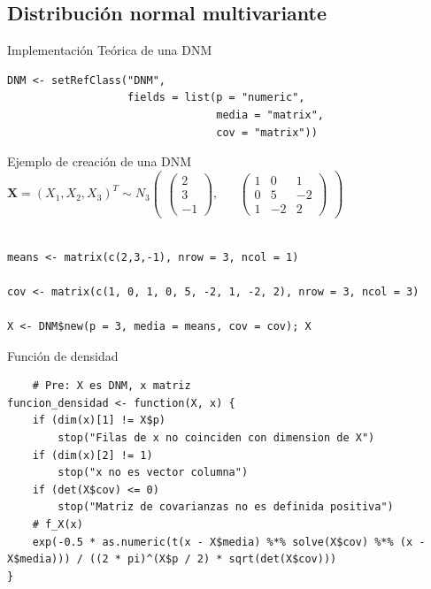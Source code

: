 \documentclass[xcolor=table]{beamer}
\begin{document}
\subsection{Distribución normal multivariante}
\begin{frame}[fragile]{Implementación Teórica de una DNM}

\begin{lstlisting}
DNM <- setRefClass("DNM", 
                   fields = list(p = "numeric", 
                                 media = "matrix", 
                                 cov = "matrix"))
\end{lstlisting}
\end{frame}

\begin{frame}[fragile]{Ejemplo de creación de una DNM}
$\pmb{X} = (X_1, X_2, X_3)^T \sim N_3 \begin{pmatrix} \begin{pmatrix} 2 \\ 3 \\ -1 \end{pmatrix}, && \begin{pmatrix} 1 & 0 & 1 \\ 0 & 5 & -2 \\ 1 & -2 & 2 \end{pmatrix} \end{pmatrix} $

\begin{lstlisting}

means <- matrix(c(2,3,-1), nrow = 3, ncol = 1)

cov <- matrix(c(1, 0, 1, 0, 5, -2, 1, -2, 2), nrow = 3, ncol = 3)

X <- DNM$new(p = 3, media = means, cov = cov); X

\end{lstlisting}
\end{frame}

\begin{frame}[fragile]{Función de densidad}
\small
  \begin{lstlisting}
    # Pre: X es DNM, x matriz
funcion_densidad <- function(X, x) {
    if (dim(x)[1] != X$p)
        stop("Filas de x no coinciden con dimension de X")
    if (dim(x)[2] != 1)
        stop("x no es vector columna")
    if (det(X$cov) <= 0)
        stop("Matriz de covarianzas no es definida positiva")
    # f_X(x)
    exp(-0.5 * as.numeric(t(x - X$media) %*% solve(X$cov) %*% (x - X$media))) / ((2 * pi)^(X$p / 2) * sqrt(det(X$cov)))
}
  \end{lstlisting}
\end{frame}
\end{document}
